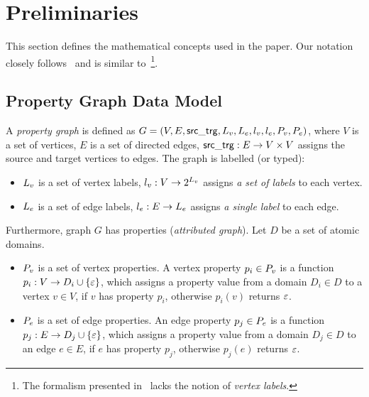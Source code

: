 \section{Preliminaries}
\label{sec:preliminaries}

This section defines the mathematical concepts used in the paper. Our notation closely follows~\cite{DBLP:conf/edbt/HolschG16} and is similar to~\cite{DBLP:books/igi/Sakr11/RodriguezN11}\footnote{The formalism presented in~\cite{DBLP:books/igi/Sakr11/RodriguezN11} lacks the notion of \emph{vertex labels}.}.

\subsection{Property Graph Data Model}

A \emph{property graph} is defined as $G = (V, E, \mathsf{src\_trg}, L_v, L_e, l_v, l_e, P_v, P_e)$, where $V$ is a set of vertices, $E$ is a set of directed edges, $\mathsf{src\_trg}: E \rightarrow V \times V$ assigns the source and target vertices to edges. The graph is labelled (or typed):
\begin{itemize}
	\item $L_v$ is a set of vertex labels, $l_v: V \rightarrow 2^{L_v}$ assigns \emph{a set of labels} to each vertex.
	\item $L_e$ is a set of edge labels, $l_e: E \rightarrow L_e$ assigns \emph{a single label} to each edge.
\end{itemize}

Furthermore, graph $G$ has properties (\emph{attributed graph}). Let $D$ be a set of atomic domains.
\begin{itemize}
	\item $P_v$ is a set of vertex properties. A vertex property $p_i \in P_v$ is a function $p_i: V \rightarrow D_i \cup \{ \varepsilon \}$, which assigns a property value from a domain $D_i \in D$ to a vertex $v \in V$, if $v$ has property $p_i$, otherwise $p_i(v)$ returns $\varepsilon$.
	\item $P_e$ is a set of edge properties. An edge property $p_j \in P_e$ is a function $p_j: E \rightarrow D_j \cup \{ \varepsilon \}$, which assigns a property value from a domain $D_j \in D$ to an edge $e \in E$, if $e$ has property $p_j$, otherwise $p_j(e)$ returns $\varepsilon$.
\end{itemize}

